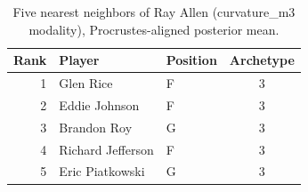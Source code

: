 \begin{table}[htbp]
  \centering\small
  \begin{tabular}{rllc}
    \toprule
    Rank & Player & Position & Archetype \\
    \midrule
    1 & Glen Rice & F & 3 \\
    2 & Eddie Johnson & F & 3 \\
    3 & Brandon Roy & G & 3 \\
    4 & Richard Jefferson & F & 3 \\
    5 & Eric Piatkowski & G & 3 \\
    \bottomrule
  \end{tabular}
  \caption{Five nearest neighbors of Ray Allen (curvature_m3 modality), Procrustes-aligned posterior mean.}
  \label{tab:Ray_Allen_neighbors_curvature_m3}
\end{table}

